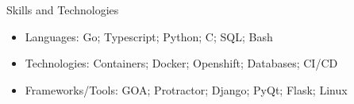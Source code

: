 \documentclass[]{mcdowellcv}
\begin{document}
	\begin{cvsection}{Skills and Technologies}
		\begin{cvsubsection}{}{}{}	
			\begin{itemize}
				\item Languages: Go; Typescript; Python; C; SQL; Bash
				\item Technologies: Containers; Docker; Openshift; Databases; CI/CD
				\item Frameworks/Tools: GOA; Protractor; Django; PyQt; Flask; Linux
			\end{itemize}
		\end{cvsubsection}
	\end{cvsection}
	
\end{document}
